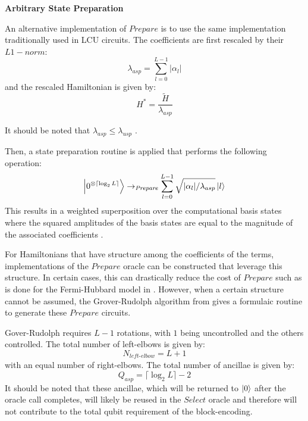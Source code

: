 \textbf{Arbitrary State Preparation}

An alternative implementation of $\textit{Prepare}$ is to use the same implementation traditionally used in LCU circuits.
The coefficients are first rescaled by their $L1-norm$:
\begin{equation}
    \lambda_{asp} = \sum_{l=0}^{L-1} |\alpha_l|
\end{equation}
and the rescaled Hamiltonian is given by:
\begin{equation}
    H^* = \frac{\tilde{H}}{\lambda_{asp}}
\end{equation}

It should be noted that $\lambda_{asp} \leq \lambda_{usp}$  .

Then, a state preparation routine is applied that performs the following operation:
\begin{equation}
    \ket{0^{\otimes \lceil \log_2{L} \rceil}} \rightarrow_{\textit{Prepare}} \sum_{l = 0}^{L-1} \sqrt{|\alpha_l| / \lambda_{asp}} \ket{l}
\end{equation}
This results in a weighted superposition over the computational basis states where the squared amplitudes of the basis states are equal to the magnitude of the associated coefficients .

For Hamiltonians that have structure among the coefficients of the terms, implementations of the $\textit{Prepare}$ oracle can be constructed that leverage this structure.
In certain cases, this can drastically reduce the cost of $\textit{Prepare}$ such as is done for the Fermi-Hubbard model in \cite{babbush2018encoding}.
However, when a certain structure cannot be assumed, the Grover-Rudolph algorithm from \cite{grover2002creating} gives a formulaic routine to generate these $\textit{Prepare}$ circuits.

Gover-Rudolph requires $L-1$ rotations, with $1$ being uncontrolled and the others controlled.
The total number of left-elbows is given by:
\begin{equation}
    N_{\textit{left-elbow}} = L + 1 
\end{equation}
with an equal number of right-elbows.
The total number of ancillae is given by:
\begin{equation}
    Q_{asp} = \lceil \log_2{L} \rceil - 2
\end{equation}
It should be noted that these ancillae, which will be returned to $\ket{0}$ after the oracle call completes, will likely be reused in the $\textit{Select}$ oracle and therefore will not contribute to the total qubit requirement of the block-encoding.

